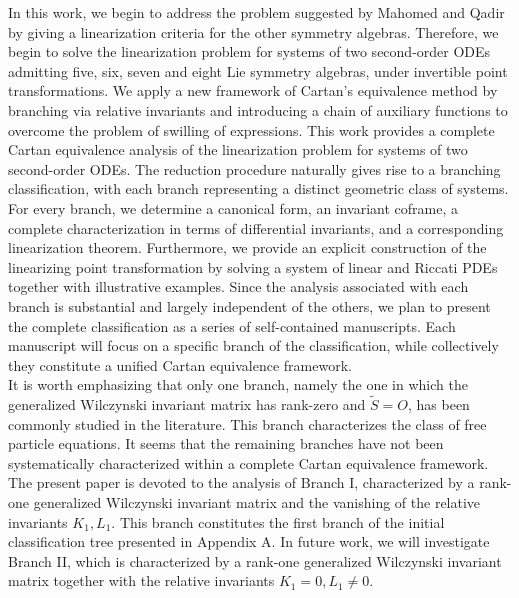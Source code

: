 \documentclass[12pt]{article}
\begin{document}
In this work, we begin to address the problem suggested by Mahomed and Qadir by giving a linearization criteria for the other symmetry algebras. Therefore, we begin to solve the linearization problem for systems of two second-order ODEs admitting five, six, seven and eight Lie symmetry algebras, under invertible point transformations. We apply a new framework of Cartan's equivalence method by branching via relative invariants and introducing a chain of auxiliary functions to overcome the problem of swilling of expressions. This work provides a complete Cartan equivalence analysis of the linearization problem for systems of two second-order ODEs. The reduction procedure naturally gives rise to a branching classification, with each branch representing a distinct geometric class of systems. For every branch, we determine a canonical form, an invariant coframe, a complete characterization in terms of differential invariants, and a corresponding linearization theorem. Furthermore, we provide an explicit construction of the linearizing point transformation by solving a system of linear and Riccati PDEs together with illustrative examples. Since the analysis associated with each branch is substantial and largely independent of the others, we plan to present the complete classification as a series of self-contained manuscripts. Each manuscript will focus on a specific branch of the classification, while collectively they constitute a unified Cartan equivalence framework.\\

It is worth emphasizing that only one branch, namely the one in which the generalized Wilczynski invariant matrix has rank-zero and $\tilde{S}=O$, has been commonly studied in the literature. This branch characterizes the class of free particle equations. It seems that the remaining branches have not been systematically characterized within a complete Cartan equivalence framework. The present paper is devoted to the analysis of Branch I, characterized by  a rank-one generalized Wilczynski invariant matrix and the vanishing of the relative invariants $K_1,L_1$. This branch constitutes the first branch of the initial classification tree presented in Appendix A. In future work, we will investigate Branch II, which is characterized by a rank-one generalized Wilczynski invariant matrix together with the relative invariants $K_1=0,L_1\neq0$.\\
\end{document}
